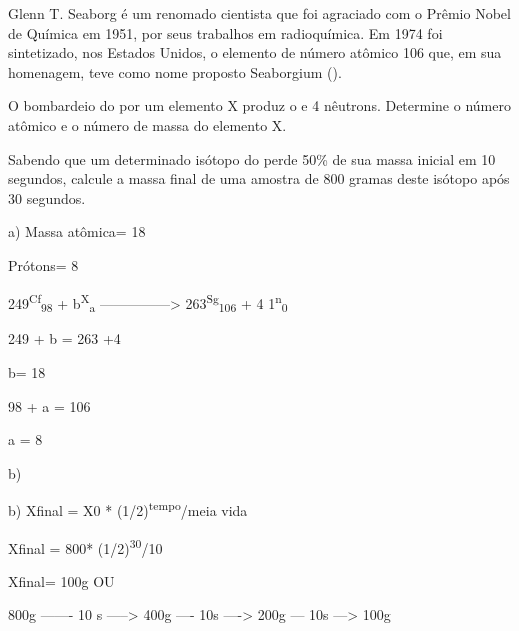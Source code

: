 \documentclass[9 pt]{scrartcl}
\def\PQA{2.0} %
\begin{document}
\begin{exercise}[points=\PQA]
Glenn T. Seaborg é um renomado cientista que foi agraciado com o Prêmio Nobel de Química em 1951, por seus trabalhos em radioquímica. Em 1974 foi sintetizado, nos Estados Unidos, o elemento de número atômico 106 que, em sua homenagem, teve como nome proposto Seaborgium ().

\begin{choice}
\choice O bombardeio do  por um elemento X produz o  e 4 nêutrons. Determine o número atômico e o número de massa do elemento X.



\blank[blank-style={\phantom{#1}},width=3\linewidth]{}


\choice Sabendo que um determinado isótopo do  perde 50\% de sua massa inicial em 10 segundos, calcule a massa final de uma amostra de 800 gramas deste isótopo após 30 segundos.
\end{choice}


\blank[blank-style={\phantom{#1}},width=8\linewidth]{}
\end{exercise}
\begin{solution}



a) Massa atômica= 18

Prótons= 8

249\textsuperscript{Cf}\textsubscript{98} + b\textsuperscript{X}\textsubscript{a} ---------------> 263\textsuperscript{Sg}\textsubscript{106} + 4 1\textsuperscript{n}\textsubscript{0}

249 + b = 263 +4

b= 18

98 + a = 106

a = 8


b)


b) Xfinal = X0 * (1/2)\textsuperscript{tempo}/meia vida

Xfinal = 800* (1/2)\textsuperscript{30}/10

Xfinal= 100g            OU

800g ------- 10 s -----> 400g ---- 10s ----> 200g --- 10s ---> 100g
\end{solution}
\end{document}
